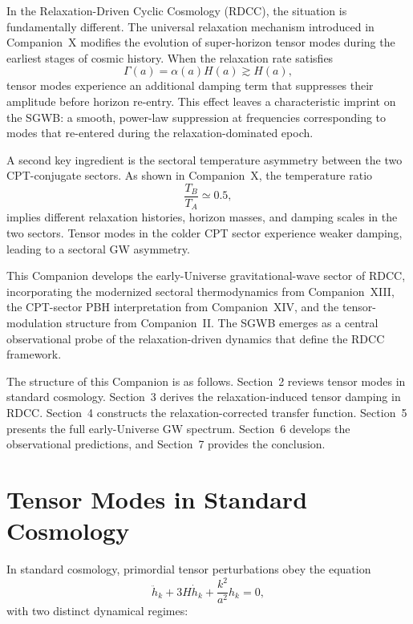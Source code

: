 \documentclass[11pt,a4paper]{article}
\begin{document}
In the Relaxation-Driven Cyclic Cosmology (RDCC), the situation is fundamentally different.
The universal relaxation mechanism introduced in Companion~X modifies the evolution of
super-horizon tensor modes during the earliest stages of cosmic history. When the relaxation
rate satisfies
\begin{equation}
\Gamma(a) = \alpha(a) H(a) \gtrsim H(a),
\end{equation}
tensor modes experience an additional damping term that suppresses their amplitude before
horizon re-entry. This effect leaves a characteristic imprint on the SGWB: a smooth, power-law
suppression at frequencies corresponding to modes that re-entered during the relaxation-dominated
epoch.

A second key ingredient is the sectoral temperature asymmetry between the two CPT-conjugate
sectors. As shown in Companion~X, the temperature ratio
\begin{equation}
\frac{T_{B}}{T_{A}} \simeq 0.5,
\end{equation}
implies different relaxation histories, horizon masses, and damping scales in the two sectors.
Tensor modes in the colder CPT sector experience weaker damping, leading to a sectoral GW
asymmetry.

This Companion develops the early-Universe gravitational-wave sector of RDCC, incorporating
the modernized sectoral thermodynamics from Companion~XIII, the CPT-sector PBH
interpretation from Companion~XIV, and the tensor-modulation structure from Companion~II.
The SGWB emerges as a central observational probe of the relaxation-driven dynamics that
define the RDCC framework.

The structure of this Companion is as follows. Section~2 reviews tensor modes in standard
cosmology. Section~3 derives the relaxation-induced tensor damping in RDCC. Section~4
constructs the relaxation-corrected transfer function. Section~5 presents the full early-Universe
GW spectrum. Section~6 develops the observational predictions, and Section~7 provides the
conclusion.


\section{Tensor Modes in Standard Cosmology}

In standard cosmology, primordial tensor perturbations obey the equation
\begin{equation}
\ddot{h}_{k} + 3H \dot{h}_{k} + \frac{k^{2}}{a^{2}} h_{k} = 0,
\end{equation}
with two distinct dynamical regimes:
\end{document}
